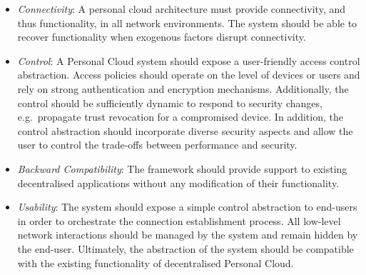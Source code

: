 
\begin{itemize}
  \item {\it Connectivity}\/: A personal cloud architecture must provide
        connectivity, and thus functionality, in all network environments.
        The system should be able to recover functionality when exogenous
        factors disrupt connectivity.     

  \item {\it Control}\/: A Personal Cloud system should expose a user-friendly
        access control abstraction.  Access policies should operate on the level
        of devices or users and rely on strong authentication and encryption
        mechanisms. Additionally, the control should be sufficiently dynamic to
        respond to security changes, e.g.~propagate trust revocation for a
        compromised device. In addition, the control abstraction should
        incorporate diverse security aspects and allow the user to control the
        trade-offs between performance and security.
   
  \item {\it Backward Compatibility}\/: The framework should provide support to
        existing decentralised applications without any modification of their
        functionality.

  \item {\it Usability}\/: The system should expose a simple control abstraction
        to end-users in order to orchestrate the connection establishment
        process. All low-level network interactions should be managed by the
        system and remain hidden by the end-user. Ultimately, the
        abstraction of the system should be compatible with the existing
        functionality of decentralised Personal Cloud. 
    

 \end{itemize}

